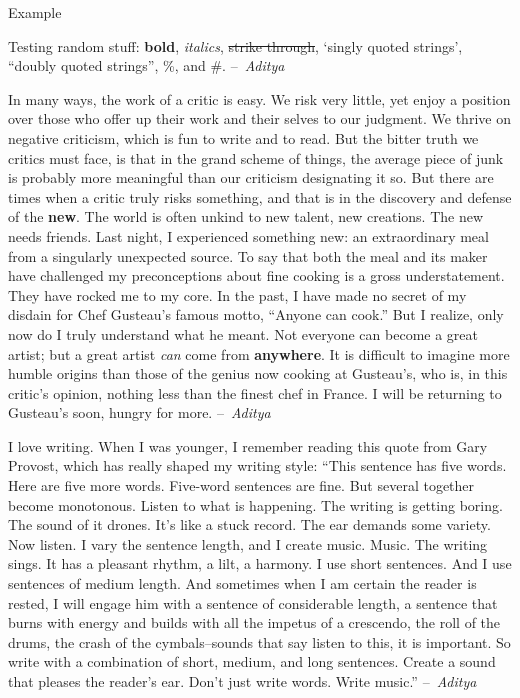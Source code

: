 \documentclass[12pt]{article}
\begin{document}
\begin{center}
{\Huge Example}
\end{center}
\vspace{1cm}

\begin{center}
Testing random stuff: \textbf{bold}, \textit{italics}, \st{strike through}, `singly quoted strings', ``doubly quoted strings'', \%, and \#. --~\textit{Aditya}

\vspace{1cm}

In many ways, the work of a critic is easy. We risk very little, yet enjoy a position over those who offer up their work and their selves to our judgment. We thrive on negative criticism, which is fun to write and to read. But the bitter truth we critics must face, is that in the grand scheme of things, the average piece of junk is probably more meaningful than our criticism designating it so. But there are times when a critic truly risks something, and that is in the discovery and defense of the \textbf{new}. The world is often unkind to new talent, new creations. The new needs friends. Last night, I experienced something new: an extraordinary meal from a singularly unexpected source. To say that both the meal and its maker have challenged my preconceptions about fine cooking is a gross understatement. They have rocked me to my core. In the past, I have made no secret of my disdain for Chef Gusteau's famous motto, ``Anyone can cook.'' But I realize, only now do I truly understand what he meant. Not everyone can become a great artist; but a great artist \textit{can} come from \textbf{anywhere}. It is difficult to imagine more humble origins than those of the genius now cooking at Gusteau's, who is, in this critic's opinion, nothing less than the finest chef in France. I will be returning to Gusteau's soon, hungry for more. --~\textit{Aditya}

\vspace{1cm}

I love writing. When I was younger, I remember reading this quote from Gary Provost, which has really shaped my writing style: ``This sentence has five words. Here are five more words. Five-word sentences are fine. But several together become monotonous. Listen to what is happening. The writing is getting boring. The sound of it drones. It’s like a stuck record. The ear demands some variety. Now listen. I vary the sentence length, and I create music. Music. The writing sings. It has a pleasant rhythm, a lilt, a harmony. I use short sentences. And I use sentences of medium length. And sometimes when I am certain the reader is rested, I will engage him with a sentence of considerable length, a sentence that burns with energy and builds with all the impetus of a crescendo, the roll of the drums, the crash of the cymbals–sounds that say listen to this, it is important. So write with a combination of short, medium, and long sentences. Create a sound that pleases the reader’s ear. Don’t just write words. Write music.'' --~\textit{Aditya}


\end{center}
\end{document}
